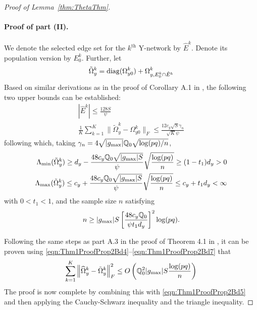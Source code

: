 \begin{proof}[Proof of Lemma~\ref{thm:ThetaThm}]
\paragraph{Proof of part (II).}
We denote the selected edge set for the $k^\text{th}$ Y-network by $\hat E^k$. Denote its population version by $E_0^k$. Further, let
%
$$
\tilde \Omega_y^k = \operatorname*{diag} (\Omega_{y0}^k) + \Omega_{y, E_0^k \cap \hat E^k}^k
$$
%
Based on similar derivations as in the proof of Corollary A.1 in \cite{MaMichailidis15}, the following two upper bounds can be established:
%
\begin{align}
| \hat E^k | \leq \frac{ 128 S }{\psi} \label{eqn:Thm1ProofProp2Bd4}\\
\frac{1}{K} \sum_{k=1}^K \| \tilde \Omega_y^k - \Omega_{y0}^k \|_F \leq
\frac{12 c_y \sqrt{S} \gamma_n} {\sqrt K \psi} \label{eqn:Thm1ProofProp2Bd5}
\end{align}
%
following which, taking $\gamma_n = 4 \sqrt{| g_{\max}|} {\mathbb{Q}}_0 \sqrt{ \log (pq)/ n}$,
%
\begin{align}
\Lambda_{\min} ( \tilde \Omega_y^k) \geq d_y - \frac{48 c_y {\mathbb{Q}}_0 \sqrt{| g_{\max}| S}}{ \psi}
\sqrt{ \frac{ \log (pq)}{n}} \geq (1 - t_1) d_y > 0 \label{eqn:Thm1ProofProp2Bd6}\\
\Lambda_{\max} ( \tilde \Omega_y^k) \leq c_y + \frac{48 c_y {\mathbb{Q}}_0 \sqrt{| g_{\max}| S}}{ \psi}
\sqrt{ \frac{ \log (pq)}{n}} \leq c_y + t_1 d_y < \infty \label{eqn:Thm1ProofProp2Bd7}
\end{align}
%
with $0 < t_1 < 1$, and the sample size $n$ satisfying
%
$$
n \geq | g_{\max}| S \left[ \frac{48 c_y {\mathbb{Q}}_0}{\psi t_1 d_y} \right]^2 \log (pq).
$$

Following the same steps as part A.3 in the proof of Theorem 4.1 in \cite{MaMichailidis15}, it can be proven using \eqref{eqn:Thm1ProofProp2Bd4}--\eqref{eqn:Thm1ProofProp2Bd7} that
%
$$
\sum_{k=1}^K \left\| \widehat \Omega_y^k - \tilde \Omega_y^k \right\|_F^2 \leq
O \left( {\mathbb{Q}}_0^2 | g_{\max}| S \frac{ \log (pq)}{n} \right)
$$
%
The proof is now complete by combining this with \eqref{eqn:Thm1ProofProp2Bd5}  and then applying the Cauchy-Schwarz inequality and the triangle inequality.
\end{proof}


